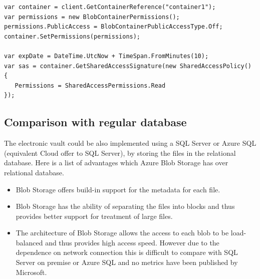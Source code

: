 \begin{verbatim}
var container = client.GetContainerReference("container1");
var permissions = new BlobContainerPermissions();
permissions.PublicAccess = BlobContainerPublicAccessType.Off;
container.SetPermissions(permissions);

var expDate = DateTime.UtcNow + TimeSpan.FromMinutes(10);
var sas = container.GetSharedAccessSignature(new SharedAccessPolicy()
{
   Permissions = SharedAccessPermissions.Read
});
\end{verbatim}

\subsection{Comparison with regular database}
The electronic vault could be also implemented using a SQL Server or Azure SQL (equivalent Cloud offer to SQL Server), by storing the files in the relational database. Here is a list of advantages which Azure Blob Storage has over relational database.

\begin{itemize}
	\item Blob Storage offers build-in support for the metadata for each file.
	\item Blob Storage has the ability of separating the files into blocks and thus provides better support for treatment of large files.
	\item The architecture of Blob Storage allows the access to each blob to be load-balanced and thus provides high access speed. However due to the dependence on network connection this is difficult to compare with SQL Server on premise or Azure SQL and no metrics have been published by Microsoft.
\end{itemize}